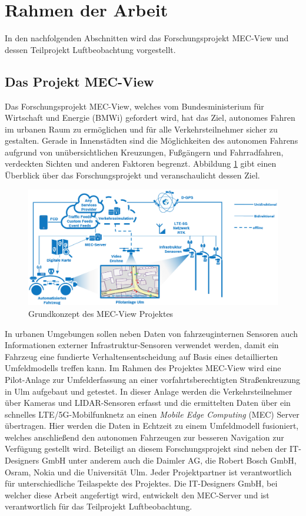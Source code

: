 \section{Rahmen der Arbeit}
\label{sec:rahmen_arbeit}

In den nachfolgenden Abschnitten wird das Forschungsprojekt MEC-View und dessen Teilprojekt Luftbeobachtung
vorgestellt.

\subsection{Das Projekt MEC-View}
\label{sec:mec_view}

Das Forschungsprojekt MEC-View, welches vom Bundesministerium für Wirtschaft und Energie (BMWi) gefordert wird,
hat das Ziel, autonomes Fahren im urbanen Raum zu ermöglichen und für alle Verkehrsteilnehmer sicher zu gestalten.
Gerade in Innenstädten sind die Möglichkeiten des autonomen Fahrens aufgrund von unübersichtlichen Kreuzungen,
Fußgängern und Fahrradfahren, verdeckten Sichten und anderen Faktoren begrenzt.
Abbildung \ref{fig:intro_mec_view_arch} gibt einen Überblick über das Forschungsprojekt und veranschaulicht dessen Ziel.

\begin{figure}[H]
\centering
    \includegraphics[width=0.6\linewidth]{resources/img/mec_view_arch}
\caption[Grundkonzept des MEC-View Projektes]{Grundkonzept des MEC-View Projektes \cite[]{mecViewWeb}}
\label{fig:intro_mec_view_arch}
\end{figure}

In urbanen Umgebungen
sollen neben Daten von fahrzeuginternen Sensoren auch Informationen externer Infrastruktur-Sensoren verwendet werden,
damit ein Fahrzeug eine fundierte Verhaltensentscheidung auf Basis eines detaillierten Umfeldmodells treffen kann.
Im Rahmen des Projektes MEC-View wird eine Pilot-Anlage zur Umfelderfassung an einer vorfahrtsberechtigten Straßenkreuzung
in Ulm aufgebaut und getestet. In dieser Anlage werden die Verkehrsteilnehmer über Kameras und LIDAR-Sensoren erfasst
und die ermittelten Daten über ein schnelles LTE/5G-Mobilfunknetz an einen \textit{Mobile Edge Computing} (MEC) Server übertragen.
Hier werden die Daten in Echtzeit zu einem Umfeldmodell fusioniert, welches anschließend den autonomen Fahrzeugen
zur besseren Navigation zur Verfügung gestellt wird. Beteiligt an diesem Forschungsprojekt sind neben
der IT-Designers GmbH unter anderem auch die Daimler AG, die Robert Bosch GmbH, Osram, Nokia und die Universität Ulm.
Jeder Projektpartner ist verantwortlich für unterschiedliche Teilaspekte des Projektes. Die IT-Designers GmbH,
bei welcher diese Arbeit angefertigt wird, entwickelt den MEC-Server und ist verantwortlich für das
Teilprojekt Luftbeobachtung. \cite[]{mecViewWeb}

